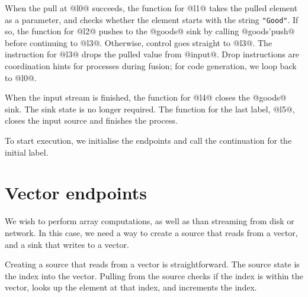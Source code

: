 When the pull at @l0@ succeeds, the function for @l1@ takes the pulled element as a parameter, and checks whether the element starts with the string \lstinline/"Good"/.
If so, the function for @l2@ pushes to the @goods@ sink by calling @goods'push@ before continuing to @l3@.
Otherwise, control goes straight to @l3@.
The instruction for @l3@ drops the pulled value from @input@.
Drop instructions are coordination hints for processes during fusion; for code generation, we loop back to @l0@.

When the input stream is finished, the function for @l4@ closes the @goods@ sink.
The sink state is no longer required.
The function for the last label, @l5@, closes the input source and finishes the process.


% 


To start execution, we initialise the endpoints and call the continuation for the initial label.

\section{Vector endpoints}

We wish to perform array computations, as well as than streaming from disk or network.
In this case, we need a way to create a source that reads from a vector, and a sink that writes to a vector.

Creating a source that reads from a vector is straightforward.
The source state is the index into the vector.
Pulling from the source checks if the index is within the vector, looks up the element at that index, and increments the index.

